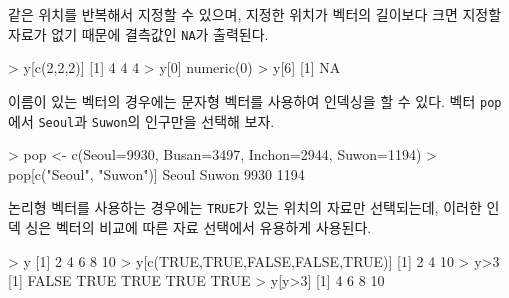 \documentclass[
]{book}
\newenvironment{Shaded}{\begin{snugshade}}{\end{snugshade}}
\newcommand{\AttributeTok}[1]{\textcolor[rgb]{0.77,0.63,0.00}{#1}}
\newcommand{\ConstantTok}[1]{\textcolor[rgb]{0.00,0.00,0.00}{#1}}
\newcommand{\DecValTok}[1]{\textcolor[rgb]{0.00,0.00,0.81}{#1}}
\newcommand{\FunctionTok}[1]{\textcolor[rgb]{0.00,0.00,0.00}{#1}}
\newcommand{\NormalTok}[1]{#1}
\newcommand{\OtherTok}[1]{\textcolor[rgb]{0.56,0.35,0.01}{#1}}
\newcommand{\SpecialCharTok}[1]{\textcolor[rgb]{0.00,0.00,0.00}{#1}}
\newcommand{\StringTok}[1]{\textcolor[rgb]{0.31,0.60,0.02}{#1}}
\begin{document}
같은 위치를 반복해서 지정할 수 있으며, 지정한 위치가 벡터의 길이보다 크면 지정할
자료가 없기 때문에 결측값인 \texttt{NA}가 출력된다.

\begin{Shaded}
\begin{Highlighting}[]
\SpecialCharTok{\textgreater{}}\NormalTok{ y[}\FunctionTok{c}\NormalTok{(}\DecValTok{2}\NormalTok{,}\DecValTok{2}\NormalTok{,}\DecValTok{2}\NormalTok{)]}
\NormalTok{[}\DecValTok{1}\NormalTok{] }\DecValTok{4} \DecValTok{4} \DecValTok{4}
\SpecialCharTok{\textgreater{}}\NormalTok{ y[}\DecValTok{0}\NormalTok{]}
\FunctionTok{numeric}\NormalTok{(}\DecValTok{0}\NormalTok{)}
\SpecialCharTok{\textgreater{}}\NormalTok{ y[}\DecValTok{6}\NormalTok{]}
\NormalTok{[}\DecValTok{1}\NormalTok{] }\ConstantTok{NA}
\end{Highlighting}
\end{Shaded}

이름이 있는 벡터의 경우에는 문자형 벡터를 사용하여 인덱싱을 할 수 있다.
벡터 \texttt{pop}에서 \texttt{Seoul}과 \texttt{Suwon}의 인구만을 선택해 보자.

\begin{Shaded}
\begin{Highlighting}[]
\SpecialCharTok{\textgreater{}}\NormalTok{ pop }\OtherTok{\textless{}{-}} \FunctionTok{c}\NormalTok{(}\AttributeTok{Seoul=}\DecValTok{9930}\NormalTok{, }\AttributeTok{Busan=}\DecValTok{3497}\NormalTok{, }\AttributeTok{Inchon=}\DecValTok{2944}\NormalTok{, }\AttributeTok{Suwon=}\DecValTok{1194}\NormalTok{)}
\SpecialCharTok{\textgreater{}}\NormalTok{ pop[}\FunctionTok{c}\NormalTok{(}\StringTok{"Seoul"}\NormalTok{, }\StringTok{"Suwon"}\NormalTok{)]}
\NormalTok{Seoul Suwon }
 \DecValTok{9930}  \DecValTok{1194} 
\end{Highlighting}
\end{Shaded}

논리형 벡터를 사용하는 경우에는 \texttt{TRUE}가 있는 위치의 자료만 선택되는데, 이러한 인덱
싱은 벡터의 비교에 따른 자료 선택에서 유용하게 사용된다.

\begin{Shaded}
\begin{Highlighting}[]
\SpecialCharTok{\textgreater{}}\NormalTok{ y}
\NormalTok{[}\DecValTok{1}\NormalTok{]  }\DecValTok{2}  \DecValTok{4}  \DecValTok{6}  \DecValTok{8} \DecValTok{10}
\SpecialCharTok{\textgreater{}}\NormalTok{ y[}\FunctionTok{c}\NormalTok{(}\ConstantTok{TRUE}\NormalTok{,}\ConstantTok{TRUE}\NormalTok{,}\ConstantTok{FALSE}\NormalTok{,}\ConstantTok{FALSE}\NormalTok{,}\ConstantTok{TRUE}\NormalTok{)]}
\NormalTok{[}\DecValTok{1}\NormalTok{]  }\DecValTok{2}  \DecValTok{4} \DecValTok{10}
\SpecialCharTok{\textgreater{}}\NormalTok{ y}\SpecialCharTok{\textgreater{}}\DecValTok{3}
\NormalTok{[}\DecValTok{1}\NormalTok{] }\ConstantTok{FALSE}  \ConstantTok{TRUE}  \ConstantTok{TRUE}  \ConstantTok{TRUE}  \ConstantTok{TRUE}
\SpecialCharTok{\textgreater{}}\NormalTok{ y[y}\SpecialCharTok{\textgreater{}}\DecValTok{3}\NormalTok{]}
\NormalTok{[}\DecValTok{1}\NormalTok{]  }\DecValTok{4}  \DecValTok{6}  \DecValTok{8} \DecValTok{10}
\end{Highlighting}
\end{Shaded}
\end{document}
